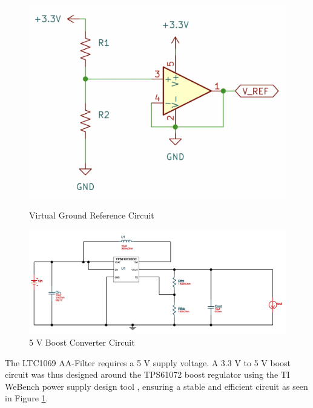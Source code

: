 \begin{figure}[H]
    \centering
    \begin{minipage}{0.35\textwidth}
        \centering
        \includegraphics[width=\textwidth]{Vground.png}
        \caption[Virtual Ground Reference Circuit]{\newline Virtual Ground Reference Circuit}
        \label{fig:virtual_ground}
    \end{minipage}\hfill
    \begin{minipage}{0.6\textwidth}
        \centering
        \includegraphics[width=\textwidth]{5V_Reg.png}
        \caption{5 V Boost Converter Circuit}
        \label{fig:5V_reg}
    \end{minipage}
\end{figure}

The LTC1069 AA-Filter requires a 5 V supply voltage. A 3.3 V to 5 V boost circuit was thus designed around the TPS61072 boost regulator using the TI WeBench power supply design tool \cite{WEBENCHCIRCUITDESIGNERDesignTool}, ensuring a stable and efficient circuit as seen in Figure \ref{fig:5V_reg}. 

